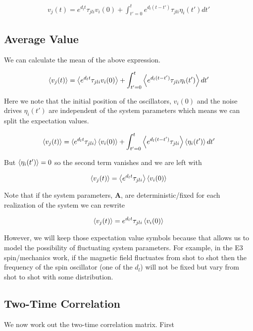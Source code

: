 \documentclass[12pt]{article}
\newcommand{\bv}[1]{\boldsymbol{#1}}
\begin{document}
\begin{align}
v_j(t) = e^{d_l t} \tau_{jli} v_i(0) + \int_{t'=0}^t e^{d_l(t-t')} \tau_{jli}\eta_i(t') dt'
\end{align}

\subsection{Average Value}
We can calculate the mean of the above expression.

\begin{align}
\Braket{v_j(t)} = \Braket{e^{d_l t}\tau_{jli} v_i(0)} + \int_{t'=0}^{t}\Braket{e^{d_l(t-t')}\tau_{jli} \eta_i(t')}dt'
\end{align}

Here we note that the initial position of the oscillators, $v_i(0)$ and the noise drives $\eta_i(t')$ are independent of the system parameters which means we can split the expectation values.

\begin{align}
\braket{v_j(t)} = \braket{e^{d_l t}\tau_{jli}}\Braket{v_i(0)} + \int_{t'=0}^t \Braket{e^{d_l (t-t')}\tau_{jli}}\Braket{\eta_i(t')}dt'
\end{align}

But $\Braket{\eta_i(t')} = 0$ so the second term vanishes and we are left with

\begin{align}
\braket{v_j(t)} = \Braket{e^{d_l t}\tau_{jli}}\Braket{v_i(0)}
\end{align}

Note that if the system parameters, $\bv{A}$, are deterministic/fixed for each realization of the system we can rewrite

\begin{align}
\braket{v_j(t)} = e^{d_l t} \tau_{jli} \Braket{v_i(0)}
\end{align}

However, we will keep those expectation value symbols because that allows us to model the possibility of fluctuating system parameters. For example, in the E3 spin/mechanics work, if the magnetic field fluctuates from shot to shot then the frequency of the spin oscillator (one of the $d_l$) will not be fixed but vary from shot to shot with some distribution.

\subsection{Two-Time Correlation}
We now work out the two-time correlation matrix. First
\end{document}
